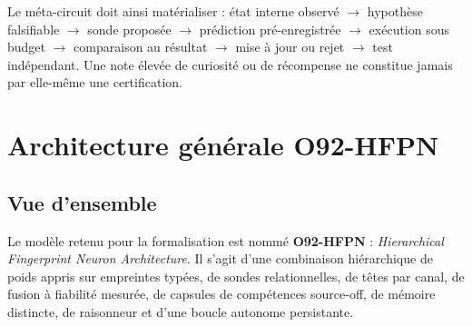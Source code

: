 \documentclass[11pt,a4paper]{report}
\begin{document}
Le méta-circuit doit ainsi matérialiser : état interne observé $\rightarrow$ hypothèse falsifiable $\rightarrow$ sonde proposée $\rightarrow$ prédiction pré-enregistrée $\rightarrow$ exécution sous budget $\rightarrow$ comparaison au résultat $\rightarrow$ mise à jour ou rejet $\rightarrow$ test indépendant. Une note élevée de curiosité ou de récompense ne constitue jamais par elle-même une certification.

\chapter{Architecture générale O92-HFPN}
\section{Vue d'ensemble}
Le modèle retenu pour la formalisation est nommé \textbf{O92-HFPN} : \emph{Hierarchical Fingerprint Neuron Architecture}. Il s'agit d'une combinaison hiérarchique de poids appris sur empreintes typées, de sondes relationnelles, de têtes par canal, de fusion à fiabilité mesurée, de capsules de compétences source-off, de mémoire distincte, de raisonneur et d'une boucle autonome persistante.
\end{document}
